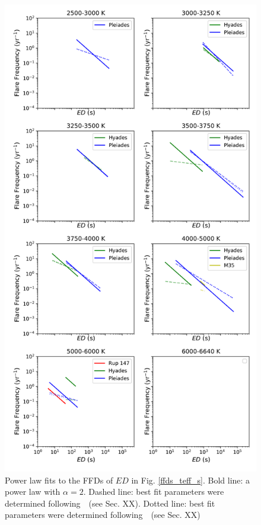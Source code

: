 \documentclass{aa}
\begin{document}
         \begin{figure}
         \centering
            \includegraphics[width=13cm]{pics/FFDs/powerlawfits_s_2019_03_22_15.png}
         \caption{Power law fits to the FFDs of $ED$ in Fig. \ref{ffds_teff_s}. Bold line: a power law with $\alpha=2$. Dashed line: best fit parameters were determined following~\citet{maschberger_powerlaw_2009}~(see Sec. XX). Dotted line: best fit parameters were determined following~\citet{bauke_powerlaw_2007}~(see Sec. XX)}
          \label{powerlawfits_s}
   \end{figure}
\end{document}
